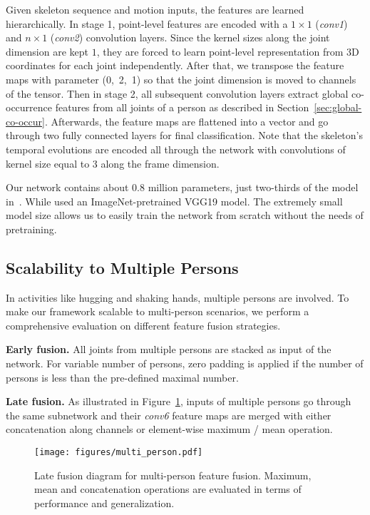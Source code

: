 \documentclass{article}
\begin{document}
Given skeleton sequence and motion inputs, the features are learned hierarchically. In stage 1, point-level features are encoded with a $1\times 1$ (\emph{conv1}) and $n\times 1$ (\emph{conv2}) convolution layers. Since the kernel sizes along the joint dimension are kept $1$, they are forced to learn point-level representation from 3D coordinates for each joint independently. After that, we transpose the feature maps with parameter (0,~2,~1) so that the joint dimension is moved to channels of the tensor. Then in stage 2, all subsequent convolution layers extract global co-occurrence features from all joints of a person as described in Section~\ref{sec:global-co-occur}. Afterwards, the feature maps are flattened into a vector and go through two fully connected layers for final classification. Note that the skeleton's temporal evolutions are encoded all through the network with convolutions of kernel size equal to 3 along the frame dimension.

Our network contains about 0.8 million parameters, just two-thirds of the model in~\cite{Li_2017_ICMEW}. While \cite{Ke_2017_CVPR} used an ImageNet-pretrained VGG19 model. The extremely small model size allows us to easily train the network from scratch without the needs of pretraining.

\subsection{Scalability to Multiple Persons}
\label{text:multi_person}

In activities like hugging and shaking hands, multiple persons are involved. To make our framework scalable to multi-person scenarios, we perform a comprehensive evaluation on different feature fusion strategies.

{\bfseries Early fusion.} All joints from multiple persons are stacked as input of the network. For variable number of persons, zero padding is applied if the number of persons is less than the pre-defined maximal number.

{\bfseries Late fusion.} As illustrated in Figure~\ref{fig:multi_person}, inputs of multiple persons go through the same subnetwork and their \emph{conv6} feature maps are merged with either concatenation along channels or element-wise maximum / mean operation.

\begin{figure}[tbp]
  \centering
  \texttt{[image: figures/multi\_person.pdf]}
  \caption{Late fusion diagram for multi-person feature fusion. Maximum, mean and concatenation operations are evaluated in terms of performance and generalization.
  \label{fig:multi_person}}
\end{figure}
\end{document}
